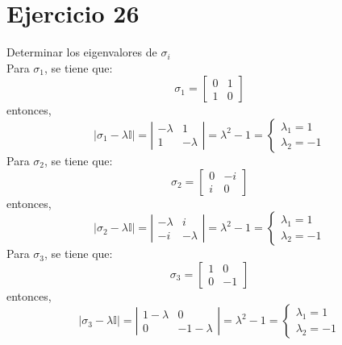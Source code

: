 \section*{Ejercicio 26}
Determinar los eigenvalores de $\sigma_i$\\
Para $\sigma_1$, se tiene que:
\begin{equation*}
    \sigma_1 =\left[\begin{matrix}
        0 & 1 \\
        1 & 0
    \end{matrix} \right]
\end{equation*}
entonces,
\begin{equation*}
    \left|\sigma_1 -\lambda\mathbb{I}\right| =
    \left|\begin{matrix}
        -\lambda & 1 \\
        1 & -\lambda
    \end{matrix} \right| = \lambda^2-1 =\left\lbrace \begin{matrix}
        \lambda_1=1 \\
        \lambda_2=-1
    \end{matrix} \right.
\end{equation*}
Para $\sigma_2$, se tiene que:
\begin{equation*}
    \sigma_2 =\left[\begin{matrix}
        0 & -i \\
        i & 0
    \end{matrix} \right]
\end{equation*}
entonces,
\begin{equation*}
    \left|\sigma_2 -\lambda\mathbb{I}\right| =
    \left|\begin{matrix}
        -\lambda & i \\
        -i & -\lambda
    \end{matrix} \right| = \lambda^2-1 =\left\lbrace \begin{matrix}
        \lambda_1=1 \\
        \lambda_2=-1
    \end{matrix} \right.
\end{equation*}
Para $\sigma_3$, se tiene que:
\begin{equation*}
    \sigma_3 =\left[\begin{matrix}
        1 & 0 \\
        0 & -1
    \end{matrix} \right]
\end{equation*}
entonces,
\begin{equation*}
    \left|\sigma_3 -\lambda\mathbb{I}\right| =
    \left|\begin{matrix}
        1-\lambda & 0 \\
        0 & -1-\lambda
    \end{matrix} \right| = \lambda^2-1 =\left\lbrace \begin{matrix}
        \lambda_1=1 \\
        \lambda_2=-1
    \end{matrix} \right.
\end{equation*}